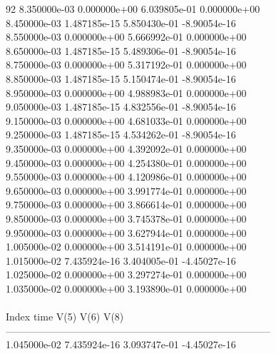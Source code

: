 92	8.350000e-03	0.000000e+00	6.039805e-01	0.000000e+00	\\ 	8.450000e-03	1.487185e-15	5.850430e-01	-8.90054e-16	\\ 	8.550000e-03	0.000000e+00	5.666992e-01	0.000000e+00	\\ 	8.650000e-03	1.487185e-15	5.489306e-01	-8.90054e-16	\\ 	8.750000e-03	0.000000e+00	5.317192e-01	0.000000e+00	\\ 	8.850000e-03	1.487185e-15	5.150474e-01	-8.90054e-16	\\ 	8.950000e-03	0.000000e+00	4.988983e-01	0.000000e+00	\\ 	9.050000e-03	1.487185e-15	4.832556e-01	-8.90054e-16	\\ 	9.150000e-03	0.000000e+00	4.681033e-01	0.000000e+00	\\ 	9.250000e-03	1.487185e-15	4.534262e-01	-8.90054e-16	\\ 	9.350000e-03	0.000000e+00	4.392092e-01	0.000000e+00	\\ 	9.450000e-03	0.000000e+00	4.254380e-01	0.000000e+00	\\ 	9.550000e-03	0.000000e+00	4.120986e-01	0.000000e+00	\\ 	9.650000e-03	0.000000e+00	3.991774e-01	0.000000e+00	\\ 	9.750000e-03	0.000000e+00	3.866614e-01	0.000000e+00	\\ 	9.850000e-03	0.000000e+00	3.745378e-01	0.000000e+00	\\ 	9.950000e-03	0.000000e+00	3.627944e-01	0.000000e+00	\\ 	1.005000e-02	0.000000e+00	3.514191e-01	0.000000e+00	\\ 	1.015000e-02	7.435924e-16	3.404005e-01	-4.45027e-16	\\ 	1.025000e-02	0.000000e+00	3.297274e-01	0.000000e+00	\\ 	1.035000e-02	0.000000e+00	3.193890e-01	0.000000e+00	\\ \hline
\\ \hline
Index   time            V(5)            V(6)            V(8)            \\ \hline
--------------------------------------------------------------------------------\\ 	1.045000e-02	7.435924e-16	3.093747e-01	-4.45027e-16	\\ \hline
